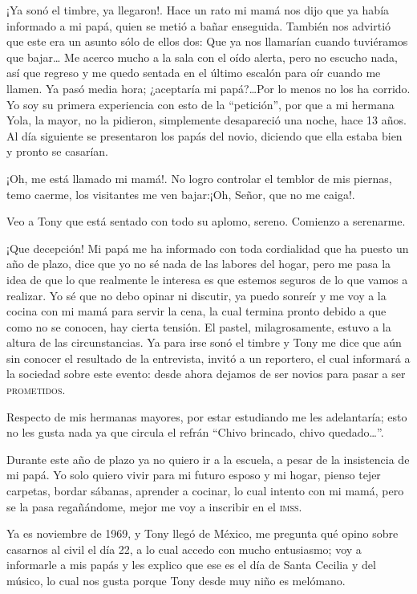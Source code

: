 \documentclass[letterpaper, 12pt]{book}
\begin{document}
¡Ya sonó el timbre, ya llegaron!. Hace un rato mi mamá nos dijo que ya había informado a mi papá, quien se metió a bañar enseguida. También nos advirtió que este era un asunto sólo de ellos dos: Que ya nos llamarían cuando tuviéramos que bajar\ldots
Me acerco mucho a la sala con el oído alerta, pero no escucho nada, así que regreso y me quedo sentada en el último escalón para oír cuando me llamen. Ya pasó media hora; ¿aceptaría mi papá?\ldots Por lo menos no los ha corrido. Yo soy su primera experiencia con esto de la ``petición'', por que a mi hermana Yola, la mayor, no la pidieron, simplemente desapareció una noche, hace 13 años.  Al día siguiente se presentaron los papás del novio, diciendo que ella estaba bien y pronto se casarían.

¡Oh, me está llamado mi mamá!. No logro controlar el temblor de mis piernas, temo caerme, los visitantes me ven bajar:¡Oh, Señor, que no me caiga!.

Veo a Tony que está sentado con todo su aplomo, sereno. Comienzo a serenarme.

¡Que decepción! Mi papá me ha informado con toda cordialidad que ha puesto un año de plazo, dice que yo no sé nada de las labores del hogar, pero me pasa la idea de que lo que realmente le interesa es que estemos seguros de lo que vamos a realizar. Yo sé que no debo opinar ni discutir, ya puedo sonreír y me voy a la cocina con mi mamá para servir la cena, la cual termina pronto debido a que como no se conocen, hay cierta tensión. El pastel, milagrosamente, estuvo a la altura de las circunstancias. Ya para irse sonó el timbre y Tony me dice que aún sin conocer el resultado de la entrevista, invitó a un reportero, el cual informará a la sociedad sobre este evento: desde ahora dejamos de ser novios para pasar a ser \textsc{prometidos}.

Respecto de mis hermanas mayores, por estar estudiando me les adelantaría; esto no les gusta nada ya que circula el refrán ``Chivo brincado, chivo quedado\ldots''.

Durante este año de plazo ya no quiero ir a la escuela, a pesar de la insistencia de mi papá. Yo solo quiero vivir para mi futuro esposo y mi hogar, pienso tejer carpetas, bordar sábanas, aprender a cocinar, lo cual intento con mi mamá, pero se la pasa regañándome, mejor me voy a inscribir en el \textsc{imss}.

Ya es noviembre de 1969, y Tony llegó de México, me pregunta qué opino sobre casarnos al civil el día 22, a lo cual accedo con mucho entusiasmo; voy a informarle a mis papás y les explico que ese es el día de Santa Cecilia y del músico, lo cual nos gusta porque Tony desde muy niño es melómano.
\end{document}
